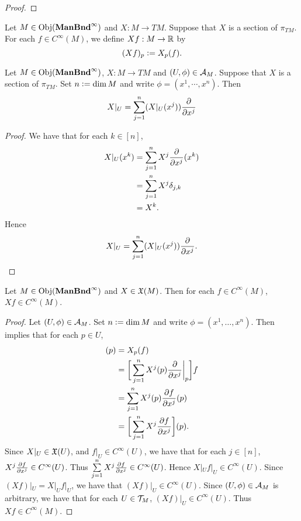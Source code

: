 \documentclass{book}
\begin{document}
\begin{proof}
\end{proof}

\begin{defn}
	Let $M \in \operatorname{Obj}(\operatorname*{\text{\textbf{ManBnd}}^{\infty}})$ and $X: M \rightarrow TM$. Suppose that $X$ is a section of $\pi_{TM}$. For each $f \in C^{\infty}(M)$, we define $Xf: M \rightarrow \mathbb{R}$ by 
	$$(Xf)_p \vcentcolon= X_p(f).$$
\end{defn}

\begin{ex}
	Let $M \in \operatorname{Obj}(\operatorname*{\text{\textbf{ManBnd}}^{\infty}})$, $X: M \rightarrow TM$ and $(U, \phi) \in \mathcal{A}_M$. Suppose that $X$ is a section of $\pi_{TM}$. Set $n \vcentcolon= \dim M$ and write $\phi = (x^1, \cdots, x^n)$. Then 
	$$X|_U = \sum_{j=1}^n (X|_U(x^j))\frac{\partial}{\partial x^j}$$ 
\end{ex}

\begin{proof}
	We have that for each $k \in [n]$, 
	\begin{align*}
		X|_U(x^k) 
		& = \sum_{j=1}^n X^j\frac{\partial}{\partial x^j} (x^k) \\
		& = \sum_{j=1}^n X^j \delta_{j,k} \\
		& = X^k.
	\end{align*}
	Hence 
	$$X|_U = \sum_{j=1}^n (X|_U(x^j))\frac{\partial}{\partial x^j}.$$
\end{proof}

\begin{ex}
	Let $M \in \operatorname{Obj}(\operatorname*{\text{\textbf{ManBnd}}^{\infty}})$ and $X \in \mathfrak{X}(M)$. Then for each $f \in C^{\infty}(M)$, $Xf \in C^{\infty}(M)$.
\end{ex}

\begin{proof}
	Let $(U, \phi) \in \mathcal{A}_M$. Set $n \vcentcolon= \dim M$ and write $\phi = (x^1, \ldots, x^n)$. Then  implies that for each $p \in U$,
	\begin{align*}
		[X|_U f|_U](p)
		& = X_p (f) \\
		& = \bigg[ \sum_{j=1}^n X^j(p) \frac{\p}{\p x^j} \bigg|_p  \bigg] f \\
		& = \sum_{j=1}^n X^j(p) \frac{\p f}{\p x^j}(p) \\
		& = \bigg[ \sum_{j=1}^n X^j \frac{\p f}{\p x^j}\bigg] (p).
	\end{align*}
	Since $X|_U \in \mathfrak{X}(U)$, and $f|_U \in C^{\infty}(U)$, we have that for each $j \in [n]$, $X^j \frac{\partial f}{\partial x^j} \in C^{\infty}(U)$. Thus $\sum\limits_{j=1}^n X^j \frac{\partial f}{\partial x^j} \in C^{\infty}(U)$. Hence $X|_U f|_U \in C^{\infty}(U)$. Since $(Xf)|_U = X|_U f|_U$, we have that $(Xf)|_U \in C^{\infty}(U)$. Since $(U, \phi) \in \mathcal{A}_M$ is arbitrary, we have that for each $U \in \mathcal{T}_M$, $(Xf)|_U \in C^{\infty}(U)$. Thus $Xf \in C^{\infty}(M)$. 
\end{proof}
\end{document}
